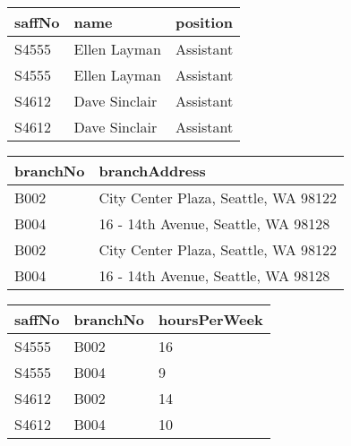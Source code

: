 \documentclass{article}
\begin{document}

\begin{tabular}{|p{0.6in}|p{0.6in}|p{1.6in}|} \hline 
saffNo & name & position \\ \hline 
S4555 & Ellen Layman & Assistant \\ \hline 
S4555 & Ellen Layman & Assistant \\ \hline 
S4612 & Dave Sinclair & Assistant \\ \hline 
S4612 & Dave Sinclair & Assistant \\ \hline 
\end{tabular}



\noindent 

\begin{tabular}{|p{0.6in}|p{1.6in}|} \hline 
branchNo & branchAddress \\ \hline 
B002 & City Center Plaza, Seattle, WA 98122 \\ \hline 
B004 & 16 - 14th Avenue, Seattle, WA 98128 \\ \hline 
B002 & City Center Plaza, Seattle, WA 98122 \\ \hline 
B004 & 16 - 14th Avenue, Seattle, WA 98128 \\ \hline 
\end{tabular}



\noindent 

\begin{tabular}{|p{1.6in}|p{0.6in}|p{0.7in}|} \hline 
saffNo & branchNo & hoursPerWeek \\ \hline 
S4555 & B002 & 16 \\ \hline 
S4555 & B004 & 9 \\ \hline 
S4612 & B002 & 14 \\ \hline 
S4612 & B004 & 10 \\ \hline 
\end{tabular}



\noindent 

\noindent 
\end{document}
